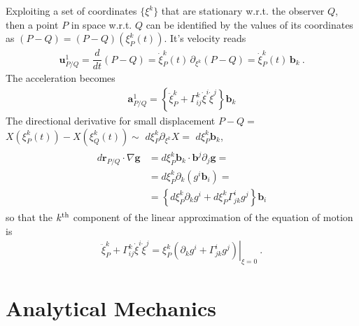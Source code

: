 \documentclass[letterpaper,10pt,english]{jupyterBook}
\begin{document}
\sphinxAtStartPar
{} Exploiting a set of coordinates \(\{ \xi^k \}\) that are stationary w.r.t. the observer \(Q\), then a point \(P\) in space w.r.t. \(Q\) can be identified by the values of its coordinates as \( (P-Q) = (P-Q)(\xi^k_P(t))\). It’s velocity reads
\begin{equation*}
\begin{split}\mathbf{u}^1_{P/Q} = \dfrac{d}{dt} ( P - Q ) = \dot{\xi}^k_P(t) \, \partial_{\xi^k} (P-Q) = \dot{\xi}^k_P(t) \, \mathbf{b}_k \ .\end{split}
\end{equation*}
\sphinxAtStartPar
The acceleration becomes
\begin{equation*}
\begin{split}\mathbf{a}^1_{P/Q} = \left\{ \ddot{\xi}^k_P + \Gamma^{k}_{ij} \dot{\xi}^i \dot{\xi}^j \right\} \mathbf{b}_k\end{split}
\end{equation*}
\sphinxAtStartPar
The directional derivative for small displacement \(P-Q =\)  \(X(\xi_P^k(t)) - X(\xi_Q^k(t))\sim\)  \(d \xi^k_P \partial_{\xi^k} X =\)  \(d \xi^k_P \mathbf{b}_k\),
\begin{equation*}
\begin{split}\begin{aligned}
  d \mathbf{r}_{P/Q} \cdot \nabla \mathbf{g}
  & = d \xi^k_P \mathbf{b}_k \cdot \mathbf{b}^j \partial_j \mathbf{g} = \\
  & = d \xi^k_P \partial_k \left( g^i \mathbf{b}_i \right) = \\
  & = \left\{ d \xi^k_P \partial_k g^i + d \xi^k_P \Gamma^i_{jk} g^j \right\} \mathbf{b}_i
\end{aligned}\end{split}
\end{equation*}
\sphinxAtStartPar
so that the \(k^{\rm th}\) component of the linear approximation of the equation of motion is
\begin{equation*}
\begin{split}\ddot{\xi}^k_P + \Gamma^{k}_{ij} \dot{\xi}^i \dot{\xi}^j = \xi^k_P \left.\left( \partial_k g^i + \Gamma^{i}_{jk} g^j \right)\right|_{\xi=0} \ .\end{split}
\end{equation*}
\sphinxstepscope


\part{Analytical Mechanics}
\end{document}
